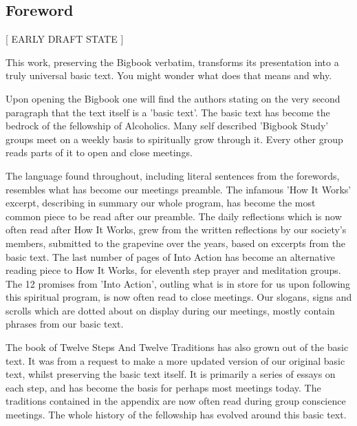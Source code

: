 \begin{fmatterchapter}

\chapter*{Foreword}

\begin{center}[ EARLY DRAFT STATE ]\end{center}

This work, preserving the Bigbook verbatim, 
    transforms its presentation 
    into a truly universal basic text.
You might wonder what does that means and why.

Upon opening the Bigbook 
    one will find the authors stating on the very second paragraph 
    that the text itself is a 'basic text'.
The basic text has become the bedrock of the fellowship of Alcoholics.
Many self described 'Bigbook Study' groups 
    meet on a weekly basis to spiritually grow through it.
Every other group reads parts of it to open and close meetings.

The language found throughout, 
    including literal sentences from the forewords, 
    resembles what has become our meetings preamble.
The infamous 'How It Works' excerpt, 
    describing in summary our whole program, 
    has become the most common piece to be read after our preamble.
The daily reflections which is now often read after How It Works, 
    grew from the written reflections by our society's members, 
    submitted to the grapevine over the years, 
    based on excerpts from the basic text.
The last number of pages of Into Action 
    has become an alternative reading piece to How It Works,
    for eleventh step prayer and meditation groups.
The 12 promises from 'Into Action', 
    outling what is in store for us upon following this spiritual program, 
    is now often read to close meetings.
Our slogans, signs and scrolls which are dotted about on display 
    during our meetings,
    mostly contain phrases from our basic text.

The book of Twelve Steps And Twelve Traditions 
    has also grown out of the basic text.
It was from a request to make a more updated version of our original basic text, whilst preserving the basic text itself.
It is primarily a series of essays on each step, 
    and has become the basis for perhaps most meetings today.
The traditions contained in the appendix 
    are now often read during group conscience meetings.
The whole history of the fellowship has evolved around this basic text.


\end{fmatterchapter}
